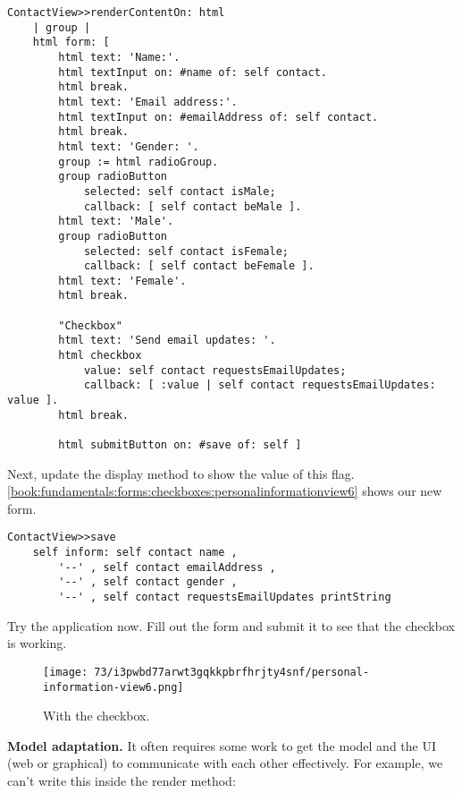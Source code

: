 \documentclass[a4paper,10pt,twoside]{book}
\begin{document}
\begin{lstlisting}
ContactView>>renderContentOn: html
    | group |
    html form: [
        html text: 'Name:'.
        html textInput on: #name of: self contact.
        html break.
        html text: 'Email address:'.
        html textInput on: #emailAddress of: self contact.
        html break.
        html text: 'Gender: '.
        group := html radioGroup.
        group radioButton
            selected: self contact isMale;
            callback: [ self contact beMale ].
        html text: 'Male'.
        group radioButton
            selected: self contact isFemale;
            callback: [ self contact beFemale ].
        html text: 'Female'.
        html break.

        "Checkbox"
        html text: 'Send email updates: '.
        html checkbox
            value: self contact requestsEmailUpdates;
            callback: [ :value | self contact requestsEmailUpdates: value ].
        html break.

        html submitButton on: #save of: self ]
\end{lstlisting}

Next, update the display method to show the value of this flag. \autoref{book:fundamentals:forms:checkboxes:personalinformationview6} shows our new form.

\begin{lstlisting}
ContactView>>save
    self inform: self contact name ,
        '--' , self contact emailAddress ,
        '--' , self contact gender ,
        '--' , self contact requestsEmailUpdates printString
\end{lstlisting}

Try the application now. Fill out the form and submit it to see that the checkbox is working.

\begin{figure}[h!tbp]
	\begin{center}
		\texttt{[image: 73/i3pwbd77arwt3gqkkpbrfhrjty4snf/personal-information-view6.png]}
		\caption{With the checkbox.\label{book:fundamentals:forms:checkboxes:personalinformationview6}}
	\end{center}
\end{figure}


\textbf{Model adaptation.} It often requires some work to get the model and the UI (web or graphical) to communicate with each other effectively. For example, we can't write this inside the render method:
\end{document}
